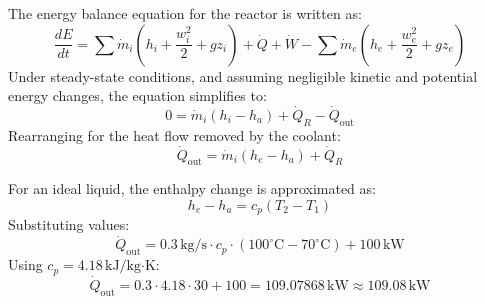 The energy balance equation for the reactor is written as:  
\[
\frac{dE}{dt} = \sum \dot{m}_i \left( h_i + \frac{w_i^2}{2} + gz_i \right) + \dot{Q} + \dot{W} - \sum \dot{m}_e \left( h_e + \frac{w_e^2}{2} + gz_e \right)
\]  
Under steady-state conditions, and assuming negligible kinetic and potential energy changes, the equation simplifies to:  
\[
0 = \dot{m}_i (h_i - h_a) + \dot{Q}_R - \dot{Q}_{\text{out}}
\]  
Rearranging for the heat flow removed by the coolant:  
\[
\dot{Q}_{\text{out}} = \dot{m}_i (h_e - h_a) + \dot{Q}_R
\]  

For an ideal liquid, the enthalpy change is approximated as:  
\[
h_e - h_a = c_p (T_2 - T_1)
\]  
Substituting values:  
\[
\dot{Q}_{\text{out}} = 0.3 \, \text{kg/s} \cdot c_p \cdot (100^\circ\text{C} - 70^\circ\text{C}) + 100 \, \text{kW}
\]  
Using \( c_p = 4.18 \, \text{kJ/kg·K} \):  
\[
\dot{Q}_{\text{out}} = 0.3 \cdot 4.18 \cdot 30 + 100 = 109.07868 \, \text{kW} \approx 109.08 \, \text{kW}
\]